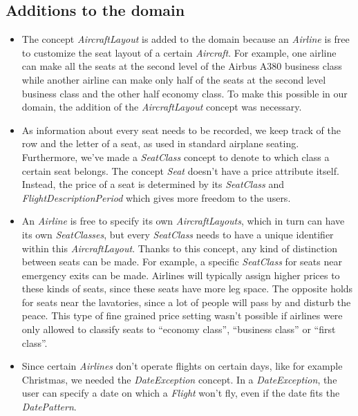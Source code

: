 \documentclass[a4paper,11pt]{article}
\newcommand{\dsltype}[1]{\textit{#1}}
\begin{document}
\subsection{Additions to the domain}
\begin{itemize}
\item The concept \dsltype{AircraftLayout} is added to the domain because an \dsltype{Airline} is free to customize the seat layout of a certain \dsltype{Aircraft}. For example, one airline can make all the seats at the second level of the Airbus A380 business class while another airline can make only half of the seats at the second level business class and the other half economy class. To make this possible in our domain, the addition of the \dsltype{AircraftLayout} concept was necessary.

\item As information about every seat needs to be recorded, we keep track of the row and the letter of a seat, as used in standard airplane seating. Furthermore, we've made a \dsltype{SeatClass} concept to denote to which class a certain seat belongs. The concept \dsltype{Seat} doesn't have a price attribute itself. Instead, the price of a seat is determined by its \dsltype{SeatClass} and \dsltype{FlightDescriptionPeriod} which gives more freedom to the users.

\item An \dsltype{Airline} is free to specify its own \dsltype{AircraftLayouts}, which in turn can have its own \dsltype{SeatClasses}, but every \dsltype{SeatClass} needs to have a unique identifier within this \dsltype{AircraftLayout}. Thanks to this concept, any kind of distinction between seats can be made. For example, a specific \dsltype{SeatClass} for seats near emergency exits can be made. Airlines will typically assign higher prices to these kinds of seats, since these seats have more leg space. The opposite holds for seats near the lavatories, since a lot of people will pass by and disturb the peace. This type of fine grained price setting wasn't possible if airlines were only allowed to classify seats to ``economy class'', ``business class'' or ``first class''.

\item Since certain \dsltype{Airlines} don't operate flights on certain days, like for example Christmas, we needed the \dsltype{DateException} concept. In a \dsltype{DateException}, the user can specify a date on which a \dsltype{Flight} won't fly, even if the date fits the \dsltype{DatePattern}.


\end{itemize}
\end{document}

